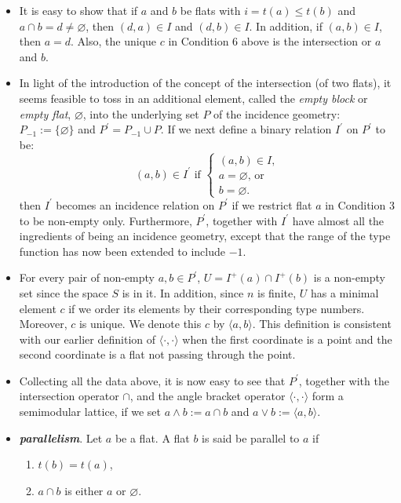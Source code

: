 \documentclass[12pt]{article}
\begin{document}
\begin{itemize}
\item It is easy to show that if $a$ and $b$ be flats with $i=t(a)\le t(b)$ and $a\cap b=d\ne \varnothing$, then $(d,a)\in I$ and $(d,b)\in I$. In addition, if $(a,b)\in I$, then $a=d$.  Also, the unique $c$ in Condition 6 above is the intersection or $a$ and $b$.
\item In light of the introduction of the concept of the intersection (of two flats), it seems feasible to toss in an additional element, called the \emph{empty block} or \emph{empty flat}, $\varnothing$, into the underlying set $P$ of the incidence geometry: $P_{-1}:=\lbrace \varnothing\rbrace$ and $P^{\prime}=P_{-1}\cup P$. If we next define a binary relation $I^{\prime}$ on $P^{\prime}$ to be:
$$(a,b)\in I^{\prime}\textrm{ if }\left\{ \begin{array}{ll} (a,b)\in I,\\ a=\varnothing\textrm{, or} \\ b=\varnothing. \end{array}
\right.$$ then $I^{\prime}$ becomes an incidence relation on $P^{\prime}$
if we restrict flat $a$ in Condition 3 to be non-empty only.  Furthermore, $P^{\prime}$, together with $I^{\prime}$ have almost all the ingredients of being an incidence geometry, except that the range of the type function has now been extended to include $-1$.
\item For every pair of non-empty $a,b\in P^{\prime}$, $U=I^{+}(a)\cap I^{+}(b)$ is a non-empty set since the space $S$ is in it.  In addition, since $n$ is finite, $U$ has a minimal element $c$ if we order its elements by their corresponding type numbers.  Moreover, $c$ is unique.  We denote this $c$ by $\langle a,b\rangle$.  This definition is consistent with our earlier definition of $\langle \cdot,\cdot \rangle$ when the first coordinate is a point and the second coordinate is a flat not passing through the point.
\item Collecting all the data above, it is now easy to see that $P^{\prime}$, together with the intersection operator $\cap$, and the angle bracket operator $\langle \cdot,\cdot \rangle$ form a semimodular lattice, if we set $a\wedge b:=a\cap b$ and $a\vee b:=\langle a,b\rangle$.
\item \textbf{\emph{parallelism}}.  Let $a$ be a flat.  A flat $b$ is said be parallel to $a$ if

\begin{enumerate}
\item $t(b)=t(a)$, \item $a\cap b$ is either $a$ or $\varnothing$.
\end{enumerate}


\end{itemize}
\end{document}
